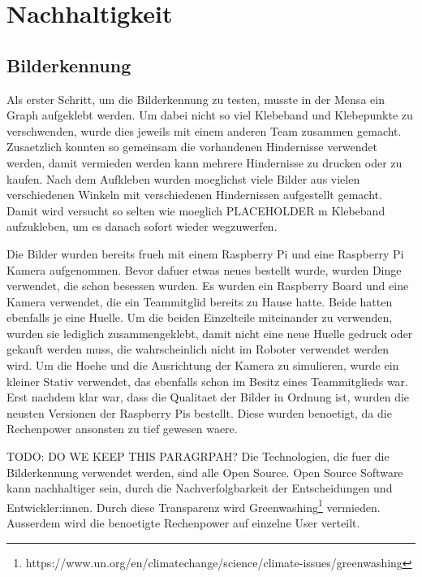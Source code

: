 \section{Nachhaltigkeit}







\subsection{Bilderkennung}

Als erster Schritt, um die Bilderkennung zu testen, musste in der Mensa ein Graph aufgeklebt werden.
Um dabei nicht so viel Klebeband und Klebepunkte zu verschwenden, wurde dies jeweils mit einem anderen Team zusammen gemacht. Zusaetzlich konnten so gemeinsam die vorhandenen Hindernisse verwendet werden, damit vermieden werden kann mehrere Hindernisse zu drucken oder zu kaufen.
Nach dem Aufkleben wurden moeglichst viele Bilder aus vielen verschiedenen Winkeln mit verschiedenen Hindernissen aufgestellt gemacht. Damit wird versucht so selten wie moeglich PLACEHOLDER m Klebeband aufzukleben, um es danach sofort wieder wegzuwerfen.

Die Bilder wurden bereits frueh mit einem Raspberry Pi und eine Raspberry Pi Kamera aufgenommen. Bevor dafuer etwas neues bestellt wurde, wurden Dinge verwendet, die schon besessen wurden. Es wurden ein Raspberry Board und eine Kamera verwendet, die ein Teammitglid bereits zu Hause hatte. Beide hatten ebenfalls je eine Huelle.
Um die beiden Einzelteile miteinander zu verwenden, wurden sie lediglich zusammengeklebt, damit nicht eine neue Huelle gedruck oder gekauft werden muss, die wahrscheinlich nicht im Roboter verwendet werden wird.
Um die Hoehe und die Ausrichtung der Kamera zu simulieren, wurde ein kleiner Stativ verwendet, das ebenfalls schon im Besitz eines Teammitglieds war.
Erst nachdem klar war, dass die Qualitaet der Bilder in Ordnung ist, wurden die neusten Versionen der Raspberry Pis bestellt. Diese wurden benoetigt, da die Rechenpower ansonsten zu tief gewesen waere.

TODO: DO WE KEEP THIS PARAGRPAH? Die Technologien, die fuer die Bilderkennung verwendet werden, sind alle Open Source. Open Source Software kann nachhaltiger sein, durch die Nachverfolgbarkeit der Entscheidungen und Entwickler:innen. Durch diese Transparenz wird Greenwashing\footnote{https://www.un.org/en/climatechange/science/climate-issues/greenwashing} vermieden. Ausserdem wird die benoetigte Rechenpower auf einzelne User verteilt\cite{oss-sustainability}.

